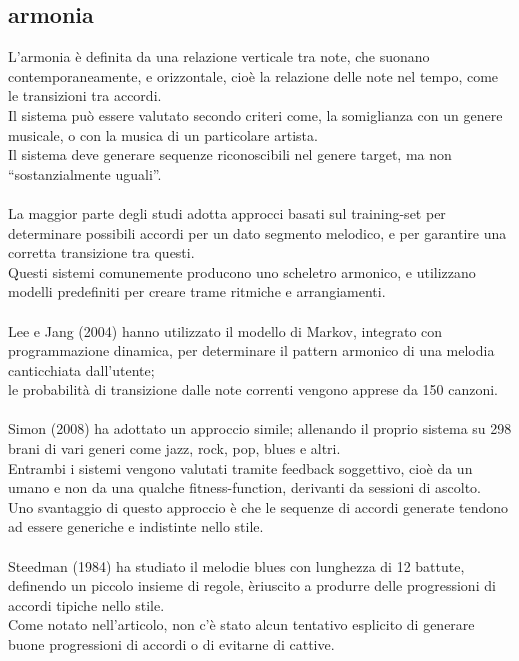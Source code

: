 \documentclass[a4paper,12pt]{report}
\begin{document}
\subsection{armonia}

L'armonia è definita da una relazione verticale tra note, che suonano contemporaneamente, e orizzontale, cioè la relazione delle note nel tempo, come le transizioni tra accordi. \\
Il sistema può essere valutato secondo criteri come, la somiglianza con un genere musicale, o con la musica di un particolare artista. \\
Il sistema deve generare sequenze riconoscibili nel genere target, ma non “sostanzialmente uguali”. \\
\\
La maggior parte degli studi adotta approcci basati sul training-set per determinare possibili accordi per un dato segmento melodico, e per garantire una corretta transizione tra questi. \\
Questi sistemi comunemente producono uno scheletro armonico, e utilizzano modelli predefiniti per creare trame ritmiche e arrangiamenti. \\
\\
Lee e Jang (2004) hanno utilizzato il modello di Markov, integrato con programmazione dinamica, per determinare il pattern armonico di una melodia canticchiata dall'utente; \\
le probabilità di transizione dalle note correnti vengono apprese da 150 canzoni. \\
\\
Simon (2008) ha adottato un approccio simile; allenando il proprio sistema su 298 brani di vari generi come jazz, rock, pop, blues e altri. \\
Entrambi i sistemi vengono valutati tramite feedback soggettivo, cioè da un umano e non da una qualche fitness-function, derivanti da sessioni di ascolto. \\
Uno svantaggio di questo approccio è che le sequenze di accordi generate tendono ad essere generiche e indistinte nello stile. \\
\\
Steedman (1984) ha studiato il melodie blues con lunghezza di 12 battute, definendo un piccolo insieme di regole, èriuscito a produrre delle progressioni di accordi tipiche nello stile. \\
Come notato nell'articolo, non c'è stato alcun tentativo esplicito di generare buone progressioni di accordi o di evitarne di cattive. 
\end{document}
